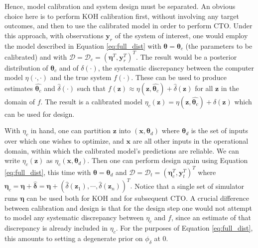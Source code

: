 \documentclass[12pt]{article}
\begin{document}
%
Hence, model calibration and system design must be separated.
%
An obvious choice here is to perform KOH calibration first, without involving any target outcomes, and then to use the calibrated model in order to perform CTO.
%
Under this approach, with observations $
\mathbf y_r$ of the system of interest, one would employ the model described in Equation \eqref{eq:full_dist} with $\boldsymbol \theta = \boldsymbol \theta_c$ (the parameters to be calibrated) and with $\mathcal D = \mathcal D_c = (\boldsymbol\eta^T, \mathbf y_r ^T)^T$.
%
The result would be a posterior distribution of $\boldsymbol \theta_c$ and of $\delta(\cdot)$, the systematic discrepancy between the computer model $\eta(\cdot,\cdot)$ and the true system $f(\cdot)$.
%
These can be used to produce estimates $\widehat{\boldsymbol\theta_c}$ and $\widehat\delta(\cdot)$ such that $f(\mathbf z)\approx\eta(\mathbf z,\widehat{\boldsymbol\theta_c})+\widehat\delta(\mathbf z)$ for all $\mathbf z$ in the domain of $f$.
%
The result is a calibrated model $\eta_c(\mathbf z)=\eta(\mathbf z,\widehat{\boldsymbol\theta_c})+\widehat\delta(\mathbf z)$ which can be used for design.
%

%
With $\eta_c$ in hand, one can partition $\mathbf z$ into $(\mathbf x,\boldsymbol\theta_d)$ where $\boldsymbol\theta_d$ is the set of inputs over which one wishes to optimize, and $\mathbf x$ are all other inputs in the operational domain, within which the calibrated model's predictions are reliable.
%
We can write $\eta_c(\mathbf z)$ as $\eta_c(\mathbf x,\boldsymbol\theta_d)$.
%
Then one can perform design again using Equation \eqref{eq:full_dist}, this time with $\boldsymbol\theta = \boldsymbol\theta_d$ and $\mathcal D = \mathcal D_t = (\boldsymbol\eta_c^T,\mathbf y_t^T)^T$ where $\boldsymbol\eta_c = \boldsymbol \eta+ \widehat{\boldsymbol \delta}= \boldsymbol \eta+ (\widehat\delta(\mathbf z_1), \cdots, \widehat\delta(\mathbf z_n))^T.$
%
Notice that a single set of simulator runs $\boldsymbol\eta$ can be used both for KOH and for subsequent CTO.
%
A crucial difference between calibration and design is that for the design step one would not attempt to model any systematic discrepancy between $\eta_c$ and $f$, since an estimate of that discrepancy is already included in $\eta_c$.
%
For the purposes of Equation \eqref{eq:full_dist}, this amounts to setting a degenerate prior on $\phi_\delta$ at 0.
%
\end{document}
